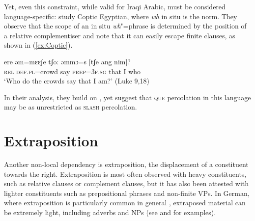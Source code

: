 \documentclass[output=paper
                ,modfonts
                ,nonflat
	        ,collection
	        ,collectionchapter
	        ,collectiontoclongg
 	        ,biblatex
                ,babelshorthands
                ,newtxmath
                ,draftmode
                ,colorlinks, citecolor=brown
]{./langsci/langscibook}
\begin{document}
{    
 \begin{exe}
  \ex \label{ex:IraqiLoc}
  \begin{xlist}
    
  \end{xlist}

\end{exe}


Yet, even this constraint, while valid for Iraqi Arabic, must be
considered language-specific: \citet{Crysmann:Reintges:14} study
Coptic Egyptian, where \emph{wh} in situ is the norm. They observe that the
scope of an in situ \emph{wh}"=phrase is determined by the position of
a relative complementiser and note that it can easily escape finite
clauses, as shown in (\ref{ex:Coptic}).

\begin{exe}
  \ex \gll ere əm=mɛɛʃe tʃoː əmmɔ=s [tʃe ang nim]?\\
  \textsc{rel} \textsc{def.pl}=crowd say \textsc{prep=3f.sg} \spacebr{}that I who\\
  \glt `Who do the crowds say that I am?'  (Luke 9,18) \label{ex:Coptic}
\end{exe}

\noindent
In their analysis, they build on \citet{Johnson:Lappin:97}, yet suggest that \textsc{que} percolation in this language may be as unrestricted as \textsc{slash} percolation.


\section{Extraposition}

Another non-local dependency is extraposition, the displacement of a
constituent towards the right. Extraposition is most often observed
with heavy constituents, such as relative clauses or complement
clauses, but it has also been attested with lighter constituents such
as prepositional phrases and non-finite VPs. In German, where
extraposition is particularly common in general
\citep{uszkoreit:etal:98}, extraposed material can be extremely light,
including adverbs and NPs (see \citealt[Section~13.1]{Mueller99a} and
\citealt[\page ix--xi]{Mueller2002b} for examples).



}
\end{document}
